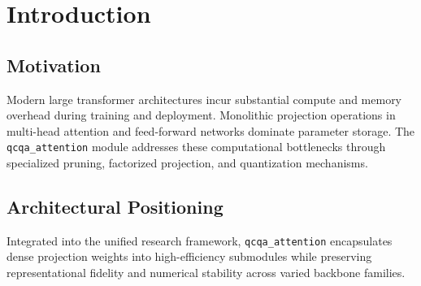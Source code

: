 \section{Introduction}

\subsection{Motivation}
Modern large transformer architectures incur substantial compute and memory overhead during training and deployment. Monolithic projection operations in multi-head attention and feed-forward networks dominate parameter storage. The \texttt{qcqa_attention} module addresses these computational bottlenecks through specialized pruning, factorized projection, and quantization mechanisms.

\subsection{Architectural Positioning}
Integrated into the unified research framework, \texttt{qcqa_attention} encapsulates dense projection weights into high-efficiency submodules while preserving representational fidelity and numerical stability across varied backbone families.
